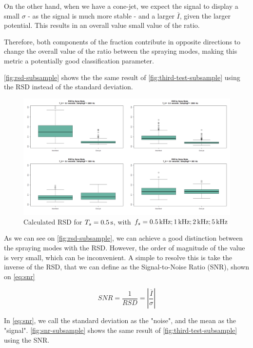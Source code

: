 \documentclass[oneside,12pt]{article}
\begin{document}
On the other hand, when we have a cone-jet, we expect the signal to display a small $\sigma$ - as the signal is much more stable -
and a larger $\overline{I}$, given the larger potential. This results in an overall value small value of the ratio.

Therefore, both components of the fraction contribute in opposite directions to change the overall value of the ratio between the spraying modes,
making this metric a potentially good classification parameter.

\autoref{fig:rsd-subsample} shows the the same result of \autoref{fig:third-test-subsample} using the RSD instead of the standard deviation.

\begin{figure}[h!]
    \centering
    \includegraphics[width=\textwidth,trim=1 1 1 1,clip]{figures/rsd-subsample.png}
    \caption{Calculated RSD for $T_s = 0.5 \,\mathrm{s}$, with $f_s = 0.5 \,\mathrm{kHz}; 1 \,\mathrm{kHz}; 2 \,\mathrm{kHz}; 5 \,\mathrm{kHz}$}
    \label{fig:rsd-subsample}
\end{figure}

As we can see on \autoref{fig:rsd-subsample}, we can achieve a good distinction between the spraying modes with the RSD. However, the 
order of magnitude of the value is very small, which can be inconvenient. A simple to resolve this is take the inverse of the RSD, that 
we can define as the Signal-to-Noise Ratio (SNR), shown on \autoref{eq:snr}

\begin{equation} \label{eq:snr}
    SNR = \frac{1}{RSD} = \left|\frac{\overline{I}}{\sigma}\right|
\end{equation}

In \autoref{eq:snr}, we call the standard deviation as the "noise", and the mean as the "signal". \autoref{fig:snr-subsample} shows the
same result of \autoref{fig:third-test-subsample} using the SNR.
\end{document}
